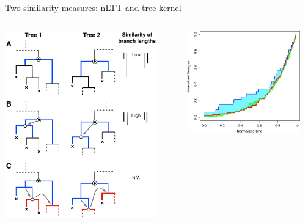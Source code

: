 \documentclass{beamer}
\begin{document}
\begin{frame}{Two similarity measures: nLTT and tree kernel}
  \begin{columns}
    \begin{column}{0.5\textwidth}
      \includegraphics[width=0.9\textwidth]{figures/treekernel}
    \end{column}
    \begin{column}{0.5\textwidth}
      \includegraphics[width=0.9\textwidth]{figures/nltt}

\end{column}
\end{columns}
\end{frame}
\end{document}
